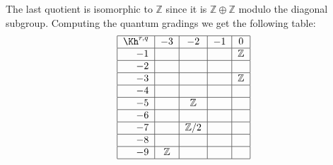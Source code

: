 The last quotient is isomorphic to $\mathbb Z$ since it is $\mathbb Z \oplus \mathbb Z$ modulo the diagonal subgroup. Computing the quantum gradings we get the following table:
\[
\begin{tabular}{|r|c|c|c|c|}
\hline
$\Kh^{r,q}$ & $-3$ & $-2$ & $-1$ & $0$ \\
\hline
$-1$ & & & & $\mathbb Z$ \\
\hline
$-2$ & & & &  \\
\hline
$-3$ & & & & $\mathbb Z$ \\
\hline
$-4$ & & & &  \\
\hline
$-5$ & & $\mathbb Z$ & &  \\
\hline
$-6$ & & & &  \\
\hline
$-7$ & & $\mathbb Z/2$ & &  \\
\hline
$-8$ & & & &  \\
\hline
$-9$ & $\mathbb Z$ & & &  \\
\hline
\end{tabular}
\]









